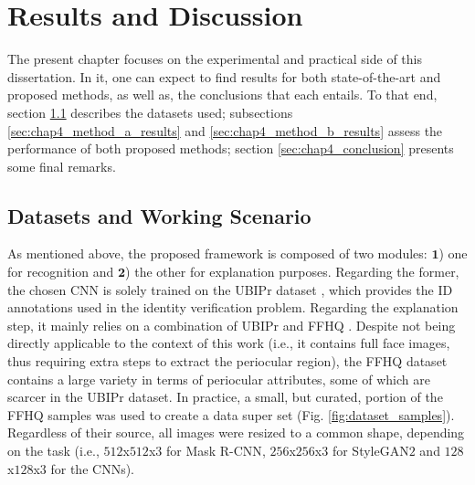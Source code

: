 \chapter{Results and Discussion}
\label{chap4:results_and_discussion}

The present chapter focuses on the experimental and practical side of this dissertation. In it, one can expect to find results for both state-of-the-art and proposed methods, as well as, the conclusions that each entails. To that end, section \ref{sec:chap4_datasets_and_working_scenario} describes the datasets used; subsections \ref{sec:chap4_method_a_results} and \ref{sec:chap4_method_b_results} assess the performance of both proposed methods; section \ref{sec:chap4_conclusion} presents some final remarks.

\section{Datasets and Working Scenario}
\label{sec:chap4_datasets_and_working_scenario}
As mentioned above, the proposed framework is composed of two modules: $\mathbf{1}$) one for recognition and $\mathbf{2}$) the other for explanation purposes. Regarding the former, the chosen \ac{CNN} is solely trained on the \ac{UBIPr} dataset \cite{ubipr}, which provides the ID annotations used in the identity verification problem. Regarding the explanation step, it mainly relies on a combination of \ac{UBIPr} and \ac{FFHQ} \cite{stylegan}. Despite not being directly applicable to the context of this work (i.e., it contains full face images, thus requiring extra steps to extract the periocular region), the \ac{FFHQ} dataset contains a large variety in terms of periocular attributes, some of which are scarcer in the \ac{UBIPr} dataset. In practice, a small, but curated, portion of the \ac{FFHQ} samples was used to create a data super set (Fig. \ref{fig:dataset_samples}). Regardless of their source, all images were resized to a common shape, depending on the task (i.e., $512$x$512$x$3$ for Mask \ac{R-CNN}, $256$x$256$x$3$ for Style\ac{GAN}$2$ and $128$x$128$x$3$ for the \ac{CNN}s).

